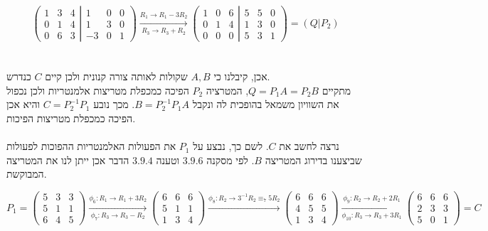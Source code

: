\documentclass{article}
\begin{document}
\[
    \left(
    \begin{matrix}
            1 & 3 & 4 \\
            0 & 1 & 4 \\
            0 & 6 & 3
        \end{matrix}
    \left|
    \begin{matrix}
            1  & 0 & 0 \\
            1  & 3 & 0 \\
            -3 & 0 & 1
        \end{matrix}
    \right.
    \right)
    \xrightarrow[R_3\rightarrow R_3+R_2]{R_1\rightarrow R_1-3R_2}
    \left(
    \begin{matrix}
            1 & 0 & 6 \\
            0 & 1 & 4 \\
            0 & 0 & 0
        \end{matrix}
    \left|
    \begin{matrix}
            5 & 5 & 0 \\
            1 & 3 & 0 \\
            5 & 3 & 1
        \end{matrix}
    \right.
    \right) =
    (Q | P_2)
\]
\\\\
אכן, קיבלנו כי $A, B$
שקולות לאותה צורה קנונית ולכן קיים $C$ כנדרש.\\
מתקיים $Q=P_1A=P_2B$,
המטרציה $P_2$
הפיכה כמכפלת מטריצות אלמנטריות ולכן נכפול את השוויון משמאל בהופכית לה ונקבל $B=P_2^{-1}P_1A$.
מכך נובע $C=P^{-1}_2P_1$ והיא אכן הפיכה כמכפלת מטריצות הפיכות.
\\\\
נרצה לחשב את $C$.
לשם כך, נבצע על $P_1$
את הפעולות האלמנטריות ההפוכות לפעולות שביצענו בדירוג המטריצה $B$.
לפי מסקנה $3.9.6$
וטענה $3.9.4$ הדבר אכן ייתן לנו את המטריצה המבוקשת.

\[
    P_1 =
    \begin{pmatrix}
        5 & 3 & 3 \\
        5 & 1 & 1 \\
        6 & 4 & 5
    \end{pmatrix}
    \xrightarrow[\phi_7: R_3\rightarrow R_3-R_2]{\phi_6: R_1\rightarrow R_1+3R_2}
    \begin{pmatrix}
        6 & 6 & 6 \\
        5 & 1 & 1 \\
        1 & 3 & 4
    \end{pmatrix}
    \xrightarrow{\phi_8: R_2\rightarrow 3^{-1}R_2\equiv_7 5R_2}
    \begin{pmatrix}
        6 & 6 & 6 \\
        4 & 5 & 5 \\
        1 & 3 & 4
    \end{pmatrix}
    \xrightarrow[\phi_{10}: R_3\rightarrow R_3+3R_1]{\phi_9: R_2\rightarrow R_2+2R_1}
    \begin{pmatrix}
        6 & 6 & 6 \\
        2 & 3 & 3 \\
        5 & 0 & 1
    \end{pmatrix} =
    C
\]
\end{document}
